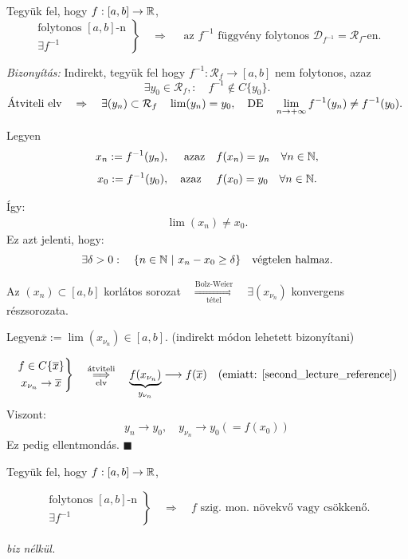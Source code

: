 \documentclass[a4paper,11.5pt]{article}
\begin{document}
	\begin{theorem}
		
		Tegyük fel, hogy $f:[a,b]\to\mathbb{R}$,
		\[\left.\begin{gathered}
		\text{folytonos } [a,b]\text{-n}\\
		\exists f^{-1}
		\end{gathered}\right\}\quad \Rightarrow\quad \text{ az }f^{-1}\text{ függvény folytonos }\mathcal{D}_{f^{-1}}=\mathcal{R}_f\text{-en.}\]
		
		\textit{Bizonyítás:} Indirekt, tegyük fel hogy $f^{-1}: \mathcal{R}_f\to[a,b]$ nem folytonos, azaz
		\[ \exists y_0\in\mathcal{R}_f,:\quad f^{-1}\notin C\{y_0\}. \]
		$\text{Átviteli elv}\quad \Rightarrow\quad \exists(y_n)\subset\mathcal{R}_f\quad  \lim(y_n)=y_0,\quad \text{DE}\quad \displaystyle\lim_{n\to +\infty} f^{-1}(y_n)\not= f^{-1}(y_0).$
		
		Legyen \[x_n:=f^{-1}(y_n),\quad \text{ azaz}\quad  f(x_n)=y_n \quad \forall n\in\mathbb{N},\]
		\[ x_0:=f^{-1}(y_0),\quad \text{azaz }\quad f(x_0)=y_0\quad \forall n\in\mathbb{N}.\]
		
		Így: \begin{gather}
			\displaystyle \lim(x_n)\not=x_0.\label{second_lecture_reference}
		\end{gather} Ez azt jelenti, hogy:
		\[ \exists\delta>0:\quad \{ n\in\N\ |\ x_n-x_0\geq \delta \}\quad \text{végtelen halmaz.} \]
		
		Az $(x_n)\subset[a,b]$ korlátos sorozat$\quad \overset{\text{Bolz-Weier}}{\underset{\text{tétel}}{\Longrightarrow}}\quad \exists (x_{\nu_n})$ konvergens részsorozata.
		
		Legyen\quad  $\overline{x}:=\lim(x_{\nu_n})\in[a,b].$ (indirekt módon lehetett bizonyítani)
		
		\[\left.\begin{gathered}
		f\in C\{\overline{x} \}\\
		x_{\nu_n}\to\overline{x}
		\end{gathered}\right\}\quad \overset{\text{átviteli}}{\underset{\text{elv}}{\Longrightarrow}}\quad \underbrace{f(x_{\nu_n})}_{y_{\nu_n}}\longrightarrow f(\overline{x}) \quad (\text{emiatt: }\ref{second_lecture_reference}) \]
		Viszont:
		\[ y_n\to y_0, \quad y_{\nu_n}\to y_0(=f(x_0)) \]
		Ez pedig ellentmondás. \quad $\blacksquare$
	\end{theorem}
	\begin{theorem}
		Tegyük fel, hogy $f:[a,b]\to\mathbb{R}$,
		
		\[\left.\begin{gathered}
		\text{folytonos }[a,b]\text{-n}\\
		\exists f^{-1}
		\end{gathered}\right\}\quad \Rightarrow\quad f\text{ szig. mon. növekvő vagy csökkenő.}\]\\
		
		\textit{biz nélkül.}
	\end{theorem}
\end{document}
